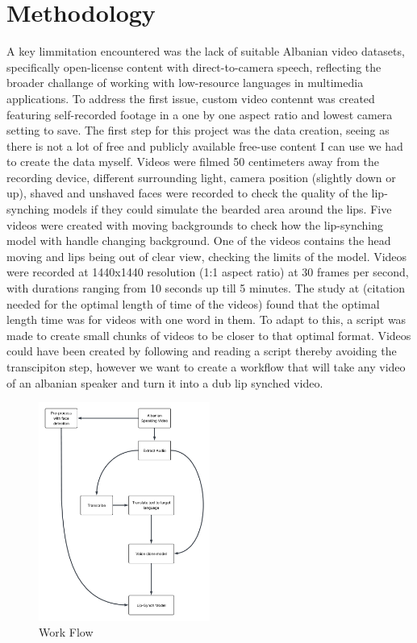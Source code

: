 \documentclass[12pt]{article}
\begin{document}
\section{Methodology}
A key limmitation encountered was the lack of suitable Albanian video datasets, specifically open-license content with direct-to-camera speech, reflecting the broader challange of working with low-resource languages in multimedia applications. To address the first issue, custom video contennt was created featuring self-recorded footage in a one by one aspect ratio and lowest camera setting to save. The first step for this project was the data creation, seeing as there is not a lot of free and publicly available free-use content I can use we had to create the data myself. Videos were filmed 50 centimeters away from the recording device, different surrounding light, camera position (slightly down or up), shaved and unshaved faces were recorded to check the quality of the lip-synching models if they could simulate the bearded area around the lips. Five videos were created with moving backgrounds to check how the lip-synching model with handle changing background. One of the videos contains the head moving and lips being out of clear view, checking the limits of the model. Videos were recorded at 1440x1440 resolution (1:1 aspect ratio) at 30 frames per second, with durations ranging from 10 seconds up till 5 minutes. The study at (citation needed for the optimal length of time of the videos) found that the optimal length time was for videos with one word in them. To adapt to this, a script was made to create small chunks of videos to be closer to that optimal format. Videos could have been created by following and reading a script thereby avoiding the transcipiton step, however we want to create a workflow that will take any video of an albanian speaker and turn it into a dub lip synched video.

\begin{figure}[h!]
    \centering
    \includegraphics[width=0.5\textwidth]{images/work-flow.png}
    \caption{Work Flow}
    \label{fig:work-flow}
\end{figure}
\end{document}
